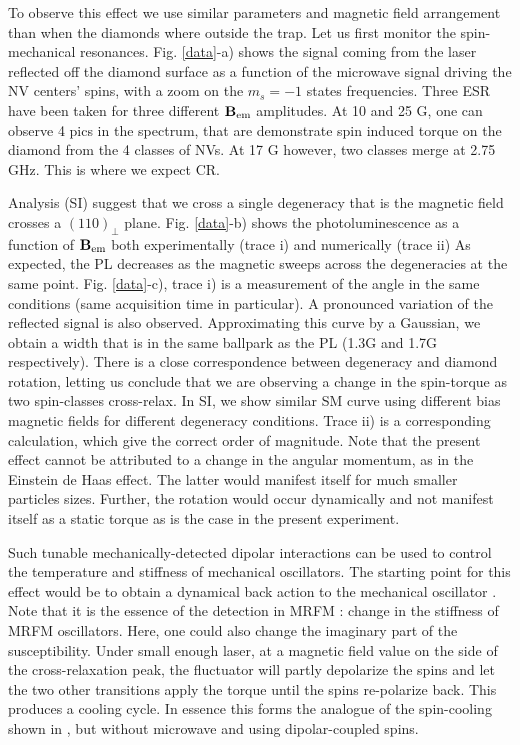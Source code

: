 \documentclass[preprintnumbers,amsmath,amssymb,superscriptaddress,twocolumn,showpacs]{revtex4-1}
\begin{document}
To observe this effect we use similar parameters and magnetic field arrangement than when the diamonds where outside the trap.
Let us first monitor the spin-mechanical resonances. 
Fig. \ref{data}-a) shows the signal coming from the laser reflected off the diamond surface as a function of the microwave signal driving the NV centers' spins, with a zoom on the $m_s=-1$ states frequencies.
Three ESR have been taken for three different $\bf B_{\rm em}$ amplitudes. 
At 10 and 25 G, one can observe 4 pics in the spectrum, that are demonstrate spin induced torque on the diamond from the 4 classes of NVs.
At 17 G however, two classes merge at 2.75 GHz. This is where we expect CR.

Analysis (SI) suggest that we cross a single degeneracy that is the magnetic field crosses a $(110)_\perp$ plane.
 Fig. \ref{data}-b) shows the photoluminescence as a function of $\bf B_{\rm em}$ both experimentally (trace i) and numerically (trace ii)
As expected, the PL decreases as the magnetic sweeps across the degeneracies at the same point. 
 Fig. \ref{data}-c), trace i) is a measurement of the angle in the same conditions (same acquisition time in particular). 
A pronounced variation of the reflected signal is also observed. Approximating this curve by a Gaussian, we obtain a width that is in the same ballpark as the PL (1.3G and 1.7G respectively).
There is a close correspondence between degeneracy and diamond rotation, letting us conclude that we are observing a change in the spin-torque as two spin-classes cross-relax. 
In SI, we show similar SM curve using different bias magnetic fields for different degeneracy conditions. 
Trace ii) is a corresponding calculation, which give the correct order of magnitude.  
Note that the present effect cannot be attributed to a change in the angular momentum, as in the Einstein de Haas effect. 
The latter would manifest itself for much smaller particles sizes. Further, the rotation would occur dynamically and not manifest itself as a static torque as is the case in the present experiment. 

Such tunable mechanically-detected dipolar interactions can be used to control the temperature and stiffness of mechanical oscillators.
The starting point for this effect would be to obtain a dynamical back action to the mechanical oscillator \cite{aspelmeyer}. 
Note that it is the essence of the detection in MRFM : change in the stiffness of MRFM oscillators. Here, one could also change the imaginary part of the susceptibility.
Under small enough laser, at a magnetic field value on the side of the cross-relaxation peak, the fluctuator will partly depolarize the spins and let the two other transitions apply the torque until the spins re-polarize back. This produces a cooling cycle.  
In essence this forms the analogue of the spin-cooling shown in \cite{DelordNat}, but without microwave and using dipolar-coupled spins.
\end{document}
